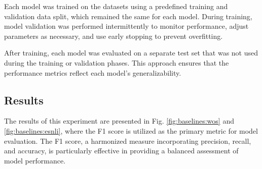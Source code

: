 \begin{table}[h]
    \centering
    \caption{Number of samples in each dataset portion}
    \label{tab:dataset_portions}
\end{table}

Each model was trained on the datasets using a predefined training and validation data split, which remained the same for each model. During training, model validation was performed intermittently to monitor performance, adjust parameters as necessary, and use early stopping to prevent overfitting.

After training, each model was evaluated on a separate test set that was not used during the training or validation phases. This approach ensures that the performance metrics reflect each model's generalizability.

\subsection*{Results}

The results of this experiment are presented in Fig. \ref{fig:baselines:wos} and \ref{fig:baselines:esnli}, where the F1 score is utilized as the primary metric for model evaluation. The F1 score, a harmonized measure incorporating precision, recall, and accuracy, is particularly effective in providing a balanced assessment of model performance.

